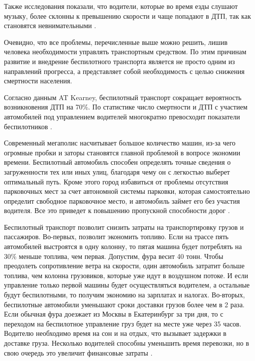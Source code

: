 Также исследования показали, что водители, которые во
время езды слушают музыку, более склонны к пре­вышению скорости и чаще попадают 
в ДТП, так как становятся невнимательными \cite{DTP_Gladkiy}.

Очевидно, что все проблемы, перечисленные выше можно решить, лишив человека 
необходимости управлять транспортным средством. По этим причинам развитие и внедрение 
беспилотного транспорта является не просто одним из направлений прогресса, а 
представляет собой необходимость с целью снижения смертности населения.

Согласно данным AT Kearney, беспилотный транспорт сокращает вероятность 
возникновения ДТП на 70\%. По
статистике число смертности и ДТП с участием автомобилей под управлением водителей
многократно превосходит показатели беспилотников \cite{Plus&Minus}.

Современный мегаполис насчитывает большое количество машин, из-за чего огромные
пробки и заторы становятся главной проблемой в вопросе экономии времени. Беспилотный
автомобиль способен определять точные сведения о загруженности тех или иных улиц,
благодаря чему он с легкостью выберет оптимальный путь. Кроме этого город избавиться от
проблемы отсутствия парковочных мест за счет автономной системы парковки, которая
самостоятельно определит свободное парковочное место, и автомобиль займет его без
участия водителя. Все это приведет к повышению пропускной способности дорог 
\cite{Pilotless_Trust}.

Беспилотный транспорт позволит снизить затраты на транспортировку грузов и
пассажиров. Во-первых, позволит экономить топливо. Если на трассе пять автомобилей
выстроятся в одну колонну, то пятая машина будет потреблять на 30\% меньше топлива, чем
первая. Допустим, фура весит 40 тонн. Чтобы преодолеть сопротивление ветра на скорости,
один автомобиль затратит больше топлива, чем колонна грузовиков, которые уже идут в
воздушном потоке. И если управление только первой машины будет осуществляться
водителем, а остальные будут беспилотными, то получим экономию на зарплатах и налогах.
Во-вторых, беспилотные автомобили уменьшают сроки доставки грузов более чем в 2
раза. Если обычная фура доезжает из Москвы в Екатеринбург за три дня, то с переходом на
беспилотное управление груз будет на месте уже через 35 часов. Водителю необходимо
время на сон и на отдых, что вызывает задержки в доставке груза. Несколько водителей
способны уменьшить время перевозки, но в свою очередь это увеличит финансовые 
затраты \cite{Pilotless_Future}.

